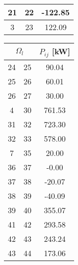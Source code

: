 \begin{table}[H]
\begin{minipage}{.5\linewidth}
\begin{tabular}{|c|c|c|}
            \hline
            21            & 22            & -122.85                       \\ 
            \hline
            3             & 23            & 122.09                        \\
            \hline
        \end{tabular}
    \end{minipage}%
    \begin{minipage}{.5\linewidth}
        \centering
        \begin{tabular}{|c|c|c|}
            \hline
            \multicolumn{2}{|c|}{$\Omega_l$} & $P_{ij}$ [kW]  \\ 
            \hline
            24            & 25            & 90.04                         \\ 
            \hline
            25            & 26            & 60.01                         \\ 
            \hline
            26            & 27            & 30.00                         \\ 
            \hline
            4             & 30            & 761.53                        \\ 
            \hline
            31            & 32            & 723.30                        \\ 
            \hline
            32            & 33            & 578.00                        \\ 
            \hline
            7             & 35            & 20.00                         \\ 
            \hline
            36            & 37            & -0.00                         \\ 
            \hline
            37            & 38            & -20.07                        \\ 
            \hline
            38            & 39            & -40.09                        \\ 
            \hline
            39            & 40            & 355.07                        \\ 
            \hline
            41            & 42            & 293.58                        \\ 
            \hline
            42            & 43            & 243.24                        \\ 
            \hline
            43            & 44            & 173.06                        \\ 

\end{tabular}
\end{minipage}
\end{table}
